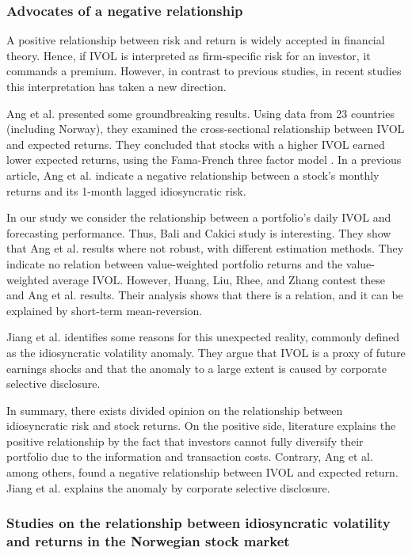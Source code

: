 \subsubsection{Advocates of a negative relationship}
A positive relationship between risk and return is widely accepted in financial theory. Hence, if IVOL is interpreted as firm-specific risk for an investor, it commands a premium. However, in contrast to previous studies, in recent studies this interpretation has taken a new direction.

Ang et al. \cite{angetal09} presented some groundbreaking results. Using data from 23 countries (including Norway), they examined the cross-sectional relationship between IVOL and expected returns. They concluded that stocks with a higher IVOL earned lower expected returns, using the Fama-French three factor model \cite{famafrench}. In a previous article, Ang et al. \cite{angetal06} indicate a negative relationship between a stock's monthly returns and its 1-month lagged idiosyncratic risk. 

In our study we consider the relationship between a portfolio's daily IVOL and forecasting performance. Thus, Bali and Cakici \cite{balicakici06} study is interesting. They show that Ang et al. \cite{angetal09} results where not robust, with different estimation methods. They indicate no relation between value-weighted portfolio returns and the value-weighted average IVOL. However, Huang, Liu, Rhee, and Zhang \cite{huang} contest these and Ang et al. \cite{angetal09} results. Their analysis shows that there is a relation, and it can be explained by short-term mean-reversion.

Jiang et al. \cite{jiangetal} identifies some reasons for this unexpected reality, commonly defined as the idiosyncratic volatility anomaly. They argue that IVOL is a proxy of future earnings shocks and that the anomaly to a large extent is caused by corporate selective disclosure. 

In summary, there exists divided opinion on the relationship between idiosyncratic risk and stock returns. On the positive side, literature explains the positive relationship by the fact that investors cannot fully diversify their portfolio due to the information and transaction costs. Contrary, Ang et al. \cite{angetal06} among others, found a negative relationship between IVOL and expected return. Jiang et al. \cite{jiangetal} explains the anomaly by corporate selective disclosure.

\subsubsection{Studies on the relationship between idiosyncratic volatility and returns in the Norwegian stock market}

